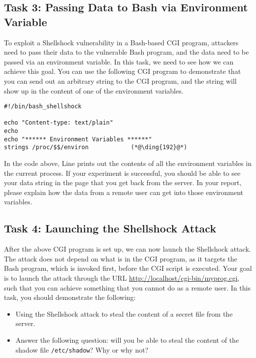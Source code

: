 \subsection{Task 3: Passing Data to Bash via Environment Variable}


To exploit a Shellshock vulnerability in a Bash-based CGI program, attackers need to 
pass their data to the vulnerable Bash program, and the data need to be
passed via an environment variable. In this task, we need to see how we can
achieve this goal. You can use the following CGI program to demonstrate
that you can send out an arbitrary string to the CGI program, and the
string will show up in the content of one of the environment variables. 


\begin{lstlisting}
#!/bin/bash_shellshock             

echo "Content-type: text/plain"
echo
echo "****** Environment Variables ******"
strings /proc/$$/environ            (*@\ding{192}@*)
\end{lstlisting}


In the code above, Line  prints out the contents of all the
environment variables in the current process. If your experiment is
successful, you should be able to see your data string in the page that you get 
back from the server. In your report, please explain how the data from a remote user can get into
those environment variables. 


\subsection{Task 4: Launching the Shellshock Attack}

After the above CGI program is set up, we can now launch the Shellshock attack. 
The attack does not depend on what is in the CGI program, as it targets
the Bash program, which is invoked first, before the CGI script is
executed. Your goal is to launch the attack through the URL
\url{http://localhost/cgi-bin/myprog.cgi}, such that you can achieve
something that you cannot do as a remote user. In this task, you should
demonstrate the following:


\begin{itemize} 
\item Using the Shellshock attack to steal the content of a secret file
from the server.  

\item Answer the following question:  will you be able to steal the content of 
the shadow file \texttt{/etc/shadow}? Why or why not?  
\end{itemize} 
  




